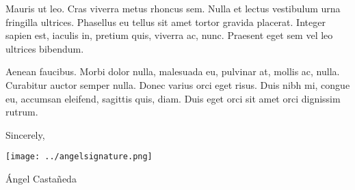 \documentclass[12pt]{article}
\newcommand{\itemspace}{\vspace{0.5em}}
\begin{document}
\itemspace

Mauris ut leo. Cras viverra metus rhoncus sem. Nulla et lectus vestibulum urna fringilla ultrices. Phasellus eu tellus sit amet tortor gravida placerat. Integer sapien est, iaculis in, pretium quis, viverra ac, nunc. Praesent eget sem vel leo ultrices bibendum. 

\itemspace

Aenean faucibus. Morbi dolor nulla, malesuada eu, pulvinar at, mollis ac, nulla. Curabitur auctor semper nulla. Donec varius orci eget risus. Duis nibh mi, congue eu, accumsan eleifend, sagittis quis, diam. Duis eget orci sit amet orci dignissim rutrum.

\vspace{15mm}

\noindent Sincerely,


\noindent
\texttt{[image: ../angelsignature.png]}

\noindent Ángel Castañeda
\end{document}

